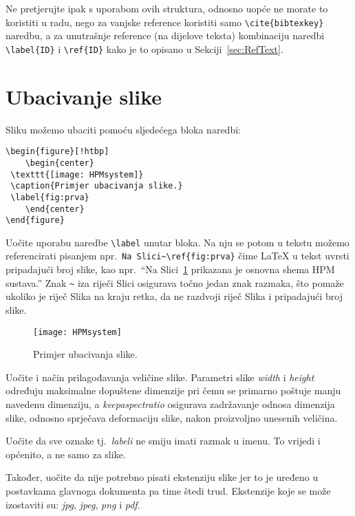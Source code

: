 Ne pretjerujte ipak s uporabom ovih struktura, odnosno uopće ne morate to koristiti u radu, nego za vanjske reference koristiti samo \verb|\cite{bibtexkey}| naredbu, a za unutrašnje reference (na dijelove teksta) kombinaciju naredbi \verb|\label{ID}| i \verb|\ref{ID}| kako je to opisano u Sekciji~\ref{sec:RefText}. 


\section{Ubacivanje slike}
Sliku možemo ubaciti pomoću sljedećega bloka naredbi:
\begin{verbatim}
\begin{figure}[!htbp]
	\begin{center}
 \texttt{[image: HPMsystem]}
 \caption{Primjer ubacivanja slike.}
 \label{fig:prva}
	\end{center}
\end{figure}
\end{verbatim}
Uočite uporabu naredbe \verb|\label| unutar bloka. Na nju se potom u tekstu možemo referencirati pisanjem npr.\ \verb|Na Slici~\ref{fig:prva}| čime \LaTeX{} u tekst uvrsti pripadajući broj slike, kao npr.\ ``Na Slici~\ref{fig:prva} prikazana je osnovna shema HPM sustava.''
Znak \verb|~| iza riječi Slici osigurava točno jedan znak razmaka, što pomaže ukoliko je riječ Slika na kraju retka, da ne razdvoji riječ Slika i pripadajući broj slike.

\begin{figure}[!htbp]
	\begin{center}
 \texttt{[image: HPMsystem]}
 \caption{Primjer ubacivanja slike.}
 \label{fig:prva}
	\end{center}
\end{figure}

Uočite i način prilagođavanja veličine slike. Parametri slike \emph{width} i \emph{height} određuju maksimalne dopuštene dimenzije pri čemu se primarno poštuje manju navedenu dimenziju, a \emph{keepaspectratio} osigurava zadržavanje odnosa dimenzija slike, odnosno sprječava deformaciju slike, nakon proizvoljno unesenih veličina.

Uočite da sve oznake tj.\ \emph{labeli} ne smiju imati razmak u imenu. To vrijedi i općenito, a ne samo za slike.

Također, uočite da nije potrebno pisati ekstenziju slike jer to je uređeno u postavkama glavnoga dokumenta pa time štedi trud. Ekstenzije koje se može izostaviti su: \emph{jpg}, \emph{jpeg}, \emph{png} i \emph{pdf}.

